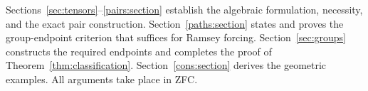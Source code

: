 Sections~\ref{sec:tensors}--\ref{pairs:section} establish the algebraic
formulation, necessity, and the exact pair construction.
Section~\ref{paths:section} states and proves the group-endpoint criterion
that suffices for Ramsey forcing. Section~\ref{sec:groups} constructs
the required endpoints and completes the proof of
Theorem~\ref{thm:classification}. Section~\ref{cons:section}
derives the geometric examples. All arguments take place in ZFC.
